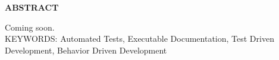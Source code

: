 \begin{center}
\textbf{ABSTRACT}
\end{center}
\singlespacing

\noindent Coming soon. \\

\noindent KEYWORDS: Automated Tests, Executable Documentation, Test Driven Development, Behavior Driven Development